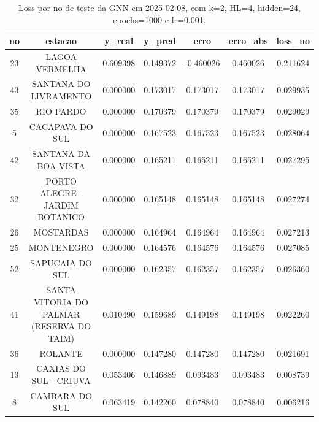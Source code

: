 \begin{table}[h]
\centering
\caption{Loss por no de teste da GNN em 2025-02-08, com k=2, HL=4, hidden=24, epochs=1000 e lr=0.001.}
\label{tab:gnn_loss_k2_hl4_h24_e1000_d20250208}
\begin{tabular}{ccccccc}
\toprule
no & estacao & y\_real & y\_pred & erro & erro\_abs & loss\_no \\
\midrule
23 & LAGOA VERMELHA & 0.609398 & 0.149372 & -0.460026 & 0.460026 & 0.211624 \\
43 & SANTANA DO LIVRAMENTO & 0.000000 & 0.173017 & 0.173017 & 0.173017 & 0.029935 \\
35 & RIO PARDO & 0.000000 & 0.170379 & 0.170379 & 0.170379 & 0.029029 \\
5 & CACAPAVA DO SUL & 0.000000 & 0.167523 & 0.167523 & 0.167523 & 0.028064 \\
42 & SANTANA DA BOA VISTA & 0.000000 & 0.165211 & 0.165211 & 0.165211 & 0.027295 \\
32 & PORTO ALEGRE - JARDIM BOTANICO & 0.000000 & 0.165148 & 0.165148 & 0.165148 & 0.027274 \\
26 & MOSTARDAS & 0.000000 & 0.164964 & 0.164964 & 0.164964 & 0.027213 \\
25 & MONTENEGRO & 0.000000 & 0.164576 & 0.164576 & 0.164576 & 0.027085 \\
52 & SAPUCAIA DO SUL & 0.000000 & 0.162357 & 0.162357 & 0.162357 & 0.026360 \\
41 & SANTA VITORIA DO PALMAR (RESERVA DO TAIM) & 0.010490 & 0.159689 & 0.149198 & 0.149198 & 0.022260 \\
36 & ROLANTE & 0.000000 & 0.147280 & 0.147280 & 0.147280 & 0.021691 \\
13 & CAXIAS DO SUL - CRIUVA & 0.053406 & 0.146889 & 0.093483 & 0.093483 & 0.008739 \\
8 & CAMBARA DO SUL & 0.063419 & 0.142260 & 0.078840 & 0.078840 & 0.006216 \\
\bottomrule
\end{tabular}
\end{table}
